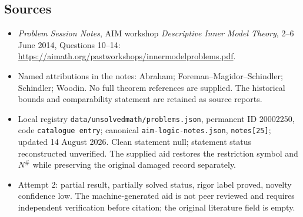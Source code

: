 \documentclass[11pt]{article}
\begin{document}
\subsection{Sources}
\begin{itemize}
\item \emph{Problem Session Notes}, AIM workshop \emph{Descriptive Inner Model Theory}, 2--6 June 2014, Questions 10--14: \url{https://aimath.org/pastworkshops/innermodelproblems.pdf}.
\item Named attributions in the notes: Abraham; Foreman--Magidor--Schindler; Schindler; Woodin. No full theorem references are supplied. The historical bounds and comparability statement are retained as source reports.
\item Local registry \texttt{data/unsolvedmath/problems.json}, permanent ID 20002250, code \texttt{catalogue entry}; canonical \texttt{aim-logic-notes.json}, \texttt{notes[25]}; updated 14 August 2026. Clean statement null; statement status reconstructed unverified. The supplied aid restores the restriction symbol and \(N^\#\) while preserving the original damaged record separately.
\item Attempt 2: partial result, partially solved status, rigor label proved, novelty confidence low. The machine-generated aid is not peer reviewed and requires independent verification before citation; the original literature field is empty.
\end{itemize}
\end{document}
